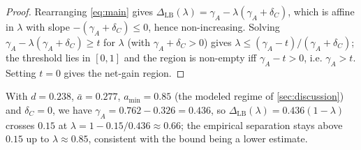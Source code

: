 \begin{proof}
Rearranging \eqref{eq:main} gives
$\Delta_{\mathrm{LB}}(\lambda)=\gamma_A-\lambda(\gamma_A+\delta_C)$, which is affine
in $\lambda$ with slope $-(\gamma_A+\delta_C)\le0$, hence non-increasing. Solving
$\gamma_A-\lambda(\gamma_A+\delta_C)\ge t$ for $\lambda$ (with $\gamma_A+\delta_C>0$)
gives $\lambda\le(\gamma_A-t)/(\gamma_A+\delta_C)$; the threshold lies in $[0,1]$ and
the region is non-empty iff $\gamma_A-t>0$, i.e. $\gamma_A>t$. Setting $t=0$ gives
the net-gain region.
\end{proof}

\begin{example}\label{ex:sweep}
With $d=0.238$, $\bar a=0.277$, $a_{\min}=0.85$ (the modeled regime of
\cref{sec:discussion}) and $\delta_C=0$, we have $\gamma_A=0.762-0.326=0.436$, so
$\Delta_{\mathrm{LB}}(\lambda)=0.436(1-\lambda)$ crosses $0.15$ at
$\lambda=1-0.15/0.436\approx0.66$; the empirical separation stays above $0.15$ up to
$\lambda\approx0.85$, consistent with the bound being a lower estimate.
\end{example}
